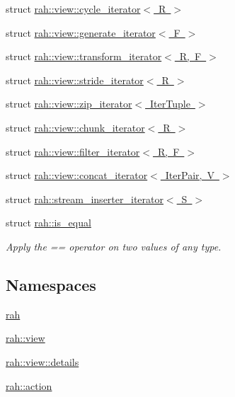 \begin{DoxyCompactItemize}
\item 
struct \mbox{\hyperlink{structrah_1_1view_1_1cycle__iterator}{rah\+::view\+::cycle\+\_\+iterator$<$ R $>$}}
\item 
struct \mbox{\hyperlink{structrah_1_1view_1_1generate__iterator}{rah\+::view\+::generate\+\_\+iterator$<$ F $>$}}
\item 
struct \mbox{\hyperlink{structrah_1_1view_1_1transform__iterator}{rah\+::view\+::transform\+\_\+iterator$<$ R, F $>$}}
\item 
struct \mbox{\hyperlink{structrah_1_1view_1_1stride__iterator}{rah\+::view\+::stride\+\_\+iterator$<$ R $>$}}
\item 
struct \mbox{\hyperlink{structrah_1_1view_1_1zip__iterator}{rah\+::view\+::zip\+\_\+iterator$<$ Iter\+Tuple $>$}}
\item 
struct \mbox{\hyperlink{structrah_1_1view_1_1chunk__iterator}{rah\+::view\+::chunk\+\_\+iterator$<$ R $>$}}
\item 
struct \mbox{\hyperlink{structrah_1_1view_1_1filter__iterator}{rah\+::view\+::filter\+\_\+iterator$<$ R, F $>$}}
\item 
struct \mbox{\hyperlink{structrah_1_1view_1_1concat__iterator}{rah\+::view\+::concat\+\_\+iterator$<$ Iter\+Pair, V $>$}}
\item 
struct \mbox{\hyperlink{structrah_1_1stream__inserter__iterator}{rah\+::stream\+\_\+inserter\+\_\+iterator$<$ S $>$}}
\item 
struct \mbox{\hyperlink{structrah_1_1is__equal}{rah\+::is\+\_\+equal}}
\begin{DoxyCompactList}\small\item\em Apply the \textquotesingle{}==\textquotesingle{} operator on two values of any type. \end{DoxyCompactList}\end{DoxyCompactItemize}
\subsection*{Namespaces}
\begin{DoxyCompactItemize}
\item 
 \mbox{\hyperlink{namespacerah}{rah}}
\item 
 \mbox{\hyperlink{namespacerah_1_1view}{rah\+::view}}
\item 
 \mbox{\hyperlink{namespacerah_1_1view_1_1details}{rah\+::view\+::details}}
\item 
 \mbox{\hyperlink{namespacerah_1_1action}{rah\+::action}}
\end{DoxyCompactItemize}
